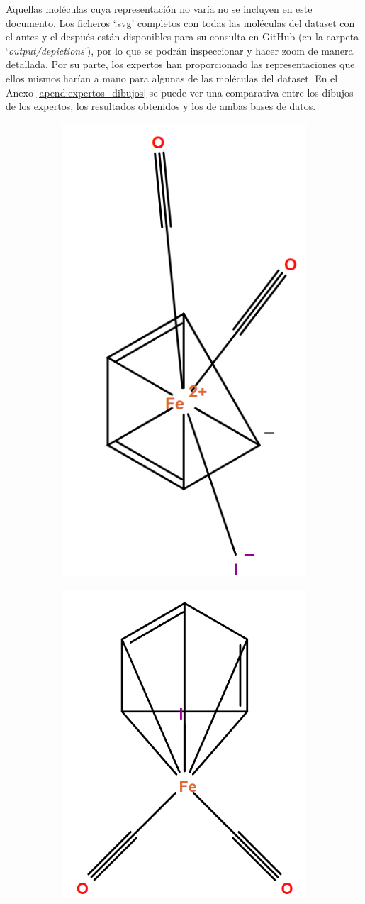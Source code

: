 Aquellas moléculas cuya representación no varía no se incluyen en este documento. Los ficheros `.svg' completos con todas las moléculas del dataset con el antes y el después están disponibles para su consulta en GitHub (en la carpeta `\textit{output/depictions}'), por lo que se podrán inspeccionar y hacer zoom de manera detallada. Por su parte, los expertos han proporcionado las representaciones que ellos mismos harían a mano para algunas de las moléculas del dataset. En el Anexo \ref{apend:expertos_dibujos} se puede ver una comparativa entre los dibujos de los expertos, los resultados obtenidos y los de ambas bases de datos.

\begin{figure}[h]
\centering
\begin{subfigure}{.35\textwidth}
  \centering
  \includegraphics[width=.45\linewidth]{imagenes/resultados/evolucion_iron_a.png}
  \caption{}
\end{subfigure}%
\begin{subfigure}{.35\textwidth}
  \centering
  \includegraphics[width=.6\linewidth]{imagenes/resultados/evolucion_iron_b.png}

\end{subfigure}
\end{figure}
